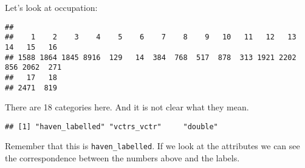 \documentclass[
]{book}
\newenvironment{Shaded}{\begin{snugshade}}{\end{snugshade}}
\newcommand{\FunctionTok}[1]{\textcolor[rgb]{0.13,0.29,0.53}{\textbf{#1}}}
\newcommand{\NormalTok}[1]{#1}
\newcommand{\SpecialCharTok}[1]{\textcolor[rgb]{0.81,0.36,0.00}{\textbf{#1}}}
\begin{document}
Let's look at occupation:

\begin{Shaded}
\end{Shaded}

\begin{verbatim}
## 
##    1    2    3    4    5    6    7    8    9   10   11   12   13   14   15   16 
## 1588 1864 1845 8916  129   14  384  768  517  878  313 1921 2202  856 2062  271 
##   17   18 
## 2471  819
\end{verbatim}

There are 18 categories here. And it is not clear what they mean.

\begin{Shaded}
\end{Shaded}

\begin{verbatim}
## [1] "haven_labelled" "vctrs_vctr"     "double"
\end{verbatim}

Remember that this is \texttt{haven\_labelled}. If we look at the attributes we can see the correspondence between the numbers above and the labels.

\begin{Shaded}
\end{Shaded}
\end{document}
